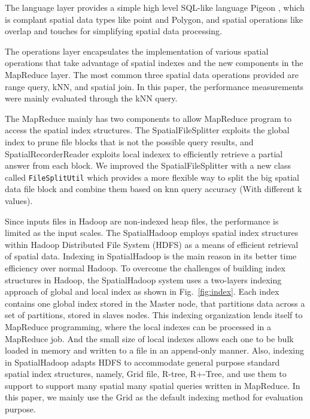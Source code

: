 The language layer provides a simple high level SQL-like language Pigeon \cite{eldawy2014pigeon}, which is complant spatial data types like point and Polygon, and spatial operations like overlap and touches for simplifying spatial data processing. 

The operations layer encapsulates the implementation of various spatial operations that take advantage of spatial indexes and the new components in the MapReduce layer. The most common three spatial data operations provided are range query, kNN, and spatial join. In this paper, the performance measurements were mainly evaluated through the kNN query.

The MapReduce mainly has two components to allow MapReduce program to access the spatial index structures. The SpatialFileSplitter exploits the global index to prune file blocks that is not the possible query results, and SpatialRecorderReader exploits local indexex to efficiently retrieve a partial answer from each block. We improved the SpatialFileSplitter with a new class called \texttt{FileSplitUtil} which provides a more flexible way to split the big spatial data file block and combine them based on knn query accuracy (With different k values).

Since inputs files in Hadoop are non-indexed heap files, the performance is limited as the input scales. The SpatialHadoop employs spatial index structures within Hadoop Distributed File System (HDFS) as a means of efficient retrieval of spatial data. Indexing in SpatialHadoop is the main reason in its better time efficiency over normal Hadoop. To overcome the challenges of building index structures in Hadoop, the SpatialHadoop system uses a two-layers indexing approach of global and local index as shown in Fig.~\ref{fig:index}. Each index contains one global index stored in the Master node, that partitions data across a set of partitions, stored in slaves nodes. This indexing organization lends itself to MapReduce programming, where the local indexes can be processed in a MapReduce job. And the small size of local indexes allows each one to be bulk loaded in memory and written to a file in an append-only manner. Also, indexing in SpatialHadoop adapts HDFS to accommodate general purpose standard spatial index structures, namely, Grid file, R-tree, R+-Tree, and use them to support to support many spatial many spatial queries written in MapReduce. In this paper, we mainly use the Grid as the default indexing method for evaluation purpose.

